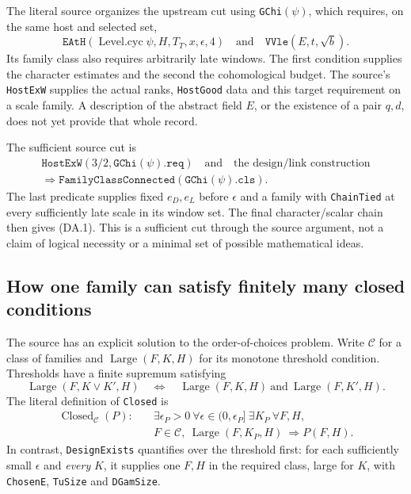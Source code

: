 The literal source organizes the upstream cut using
\texttt{GChi}$(\psi)$, which requires, on the same host and selected set,
\[
 \texttt{EAtH}(\operatorname{Level.cyc}\psi,H,T_T,x,\epsilon,4)
 \quad\text{and}\quad
 \texttt{VVle}(E,t,\sqrt b).                               \tag{DA.2}
\]
Its family class also requires arbitrarily late windows.  The first
condition supplies the character estimates and the second the
cohomological budget.  The source's
\texttt{HostExW} supplies the actual ranks, \texttt{HostGood} data and
this target requirement on a scale family.  A description of the abstract
field $E$, or the existence of a pair $q,d$, does not yet provide that
whole record.

The sufficient source cut is
\[
 \begin{gathered}
 \texttt{HostExW}(3/2,\texttt{GChi}(\psi).\texttt{req})\quad\text{and}\quad
 \text{the design/link construction}\\
 \Longrightarrow
 \texttt{FamilyClassConnected}(\texttt{GChi}(\psi).\texttt{cls}).
 \end{gathered}
                                                               \tag{DA.3}
\]
The last predicate supplies fixed $e_D,e_L$ before $\epsilon$ and a
family with \texttt{ChainTied} at every sufficiently late scale in its
window set.  The final character/scalar chain then gives (DA.1).
This is a sufficient cut through the source argument, not a claim of
logical necessity or a minimal set of possible mathematical ideas.

\subsection{How one family can satisfy finitely many closed conditions}

The source has an explicit solution to the order-of-choices problem.
Write $\mathcal C$ for a class of families and
$\operatorname{Large}(F,K,H)$ for its monotone threshold condition.
Thresholds have a finite supremum satisfying
\[
 \operatorname{Large}(F,K\vee K',H)
 \quad\Longleftrightarrow\quad
 \operatorname{Large}(F,K,H)\ \text{and}\
 \operatorname{Large}(F,K',H).                             \tag{DA.4}
\]
The literal definition of \texttt{Closed} is
\[
 \begin{split}
 \operatorname{Closed}_{\mathcal C}(P):\quad
 &\exists\epsilon_P>0\ \forall\epsilon\in(0,\epsilon_P]
 \ \exists K_P\ \forall F,H,\\
 &F\in\mathcal C,\ \operatorname{Large}(F,K_P,H)
 \ \Longrightarrow P(F,H).
 \end{split}                                                   \tag{DA.5}
\]
In contrast, \texttt{DesignExists} quantifies over the threshold first:
for each sufficiently small $\epsilon$ and \emph{every} $K$, it supplies
one $F,H$ in the required class, large for $K$, with
\texttt{ChosenE}, \texttt{TuSize} and \texttt{DGamSize}.

